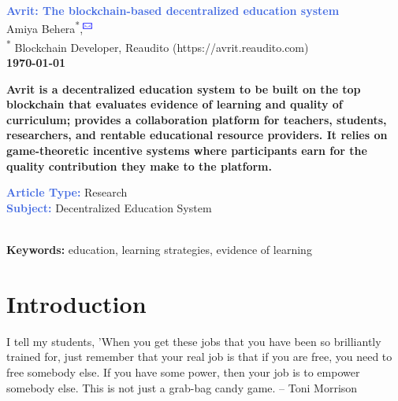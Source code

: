 \documentclass[a4paper,12pt,twoside]{extarticle}
\newcommand{\thedate}{\today}
\begin{document}
\sloppy
\begin{adjustwidth}{11em}{}


\thispagestyle{firststyle}




\LARGE{\textbf{\textcolor{RoyalBlue}{Avrit: The blockchain-based decentralized education system}}}\\[5mm]



\footnotesize{Amiya Behera\textsuperscript{*},\textsuperscript{\includegraphics[width=9pt]{mail.png}}}
\\
\scriptsize{\textsuperscript{*} Blockchain Developer, Reaudito (https://avrit.reaudito.com)\\[5mm]}
\centering\textbf{\thedate}


\footnotesize{
\begin{mdframed}[style=abstractstyle]
\textbf{Avrit is a decentralized education system to be built on the top blockchain that evaluates evidence of learning and quality of curriculum; provides a collaboration platform for teachers, students, researchers, and rentable educational resource providers.  It relies on game-theoretic incentive systems where participants earn for the quality contribution they make to the platform.}
\end{mdframed}
}
\raggedright
  \footnotesize{\textbf{\textcolor{RoyalBlue}{Article Type:}}}
  \footnotesize{Research}  \\
	\footnotesize{\textbf{\textcolor{RoyalBlue}{Subject:}}} \footnotesize{Decentralized Education System} \\[10pt]
	 

 \footnotesize{\textbf{Keywords:}} \footnotesize{education, learning strategies, evidence of learning}  \\

 \section*{Introduction}
 \begin{quoting}
 I tell my students, 'When you get these jobs that you have been so brilliantly trained for, just remember that your real job is that if you are free, you need to free somebody else. If you have some power, then your job is to empower somebody else. This is not just a grab-bag candy game.
 -- Toni Morrison
\end{quoting}




\end{adjustwidth}
\end{document}
